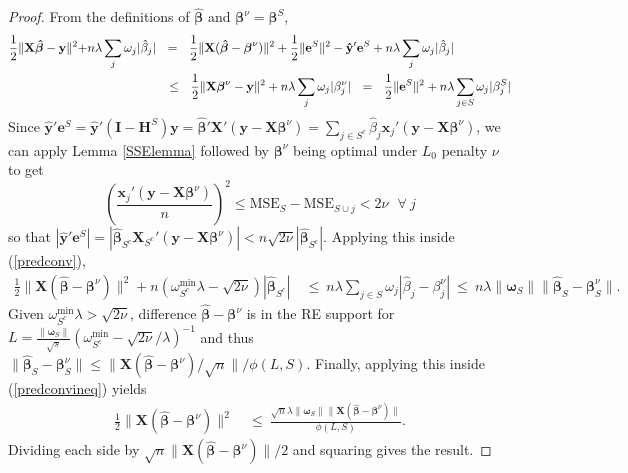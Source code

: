 \documentclass[12pt]{article}
\newcommand{\bs}[1]{\boldsymbol{#1}}
\newcommand{\mr}[1]{\mathrm{#1}}
\newcommand{\bm}[1]{\mathbf{#1}}
\begin{document}
\begin{proof}
From the definitions of $\bs{\hat\beta}$ and $\bs{\beta}^\nu = \bs{\beta}^S$, 
\begin{align}\label{predconv}
\frac{1}{2}\|\bm{X}\bs{\hat \beta}-\bm{y}\|^2 + & n\lambda\sum_j\omega_j|\hat\beta_j|  ~~=~~ \frac{1}{2}\|\bm{X}(\bs{\hat\beta}-\bs{\beta}^\nu)\|^2 + \frac{1}{2}\|\bm{e}^S\|^2 - \bm{\hat y}'\bm{e}^S+ n\lambda\sum_j\omega_j|\hat\beta_j|\\
&~~~~~~~~~~~~~~~~~~~ \leq~~ \frac{1}{2}\|\bm{X}\bs{\beta}^\nu-\bm{y}\|^2 + n\lambda\sum_j\omega_j|\beta^\nu_j| ~~=~~ \frac{1}{2}\|\bm{e}^S\|^2 + n\lambda\sum_{j\in S}\omega_j|\beta^S_j|\notag
\end{align}
  Since $\bm{\hat y}'\bm{e}^S = \bm{\hat y}'(\bm{I}-\bm{H}^S)\bm{y} =
\bs{\hat\beta}'\bm{X}'(\bm{y}-\bm{X}\bs{\beta}^\nu) = 
\sum_{j\in S^c} \hat\beta_j\bs{x}_j'(\bm{y}-\bm{X}\bs{\beta}^\nu)
$,
 we can apply Lemma \ref{SSElemma} followed by $\bs{\beta}^\nu$ being optimal under $L_0$ penalty $\nu$ to get 
\begin{equation} \label{L0ineq}
\left(\frac{\bs{x}_j'(\bm{y}-\bm{X}\bs{\beta}^\nu)}{n}\right)^2
\leq \mr{MSE}_S - \mr{MSE}_{S\cup j} < 2\nu ~~~\forall~j
\end{equation}
so that $|\bm{\hat y}'\bm{e}^S| = |\bs{\hat\beta}_{S^c}\bm{X}_{S^c}'(\bm{y}-\bm{X}\bs{\beta}^\nu)| < n\sqrt{2\nu}|\bs{\hat\beta}_{S^c}|$.  Applying this inside (\ref{predconv}),
\begin{align}\label{predconvineq}
\frac{1}{2}\|\bm{X}(\bs{\hat\beta}-\bs{\beta}^\nu)\|^2
  + n\left(\omega^{\mr{min}}_{S^c}\lambda-\sqrt{2\nu}\right)|\bs{\hat\beta}_{S^c}|
  &~\leq~ n\lambda\sum_{j\in S}\omega_j|\hat\beta_{j}-\beta^\nu_j|
  ~\leq~ n\lambda\|\bs{\omega}_S\|\|\bs{\hat\beta}_{S}-\bs{\beta}^\nu_S\|.
\end{align}
Given $\omega^{\mr{min}}_{S^c}\lambda > \sqrt{2\nu}$,
difference $\bs{\hat\beta}-\bs{\beta}^\nu$ is in the RE support for 
$L=\frac{\|\bs{\omega}_S\|}{\sqrt{s}}(\omega^{\mr{min}}_{S^c}-\sqrt{2\nu}/\lambda)^{-1}$ and thus $\|\bs{\hat\beta}_{S}-\bs{\beta}^\nu_S\| \leq \|\bm{X}(\bs{\hat\beta}-\bs{\beta}^\nu)/\sqrt{n}\|/\phi(L,S)$.  Finally, applying this inside (\ref{predconvineq}) yields
\begin{align}
\frac{1}{2}\|\bm{X}(\bs{\hat\beta}-\bs{\beta}^\nu)\|^2
  &~\leq~ \frac{\sqrt{n}\lambda\|\bs{\omega}_S\|\|\bm{X}(\bs{\hat\beta}-\bs{\beta}^\nu)\|}
  {\phi(L, S)}.
\end{align}
Dividing each side by $\sqrt{n}\|\bm{X}(\bs{\hat\beta}-\bs{\beta}^\nu)\|/2$ and squaring gives the result.
\end{proof}
\end{document}
